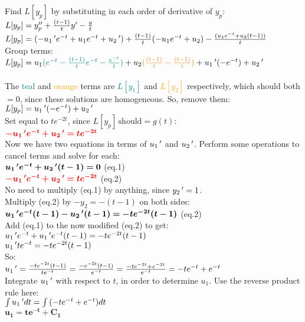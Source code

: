\documentclass{article}
\begin{document}
\begin{enumerate}
\begin{enumerate}
Find $L[y_p]$ by substituting in each order of derivative of $y_p$:\\
$L[y_p] = y_p'' + {(t-1)\over t}y' - {y\over t}$\\
$L[y_p] = (- u_1\,\sp{\prime}e\sp{-t} + u_1e\sp{-t} + u_2\,\sp{\prime}) + {(t-1)\over{t}}(- u_1e\sp{-t} + u_2) - {(u_1e\sp{-t} + u_2(t-1))\over t}$\\
Group terms:\\
$L[y_p] = u_1\textcolor{teal}{(e^{-t} -{(t-1)\over t}e^{-t} -{e^{-t}\over t} )} + u_2\textcolor{orange}{({(t-1)\over t} - {(t-1)\over t})} + u_1\,\sp{\prime}(-e^{-t}) + u_2\,\sp{\prime}$\\\\
The \textcolor{teal}{teal} and \textcolor{orange}{orange} terms are \textcolor{teal}{$L[y_1]$} and \textcolor{orange}{$L[y_2]$} respectively, which should both$=0$, since these solutions are homogeneous. So, remove them:\\
$L[y_p] = u_1\,\sp{\prime}(-e^{-t}) + u_2\,\sp{\prime}$\\
Set equal to $te^{-2t}$, since $L[y_p]\,\text{should} = g(t)$:\\
$\textcolor{red}{\bm{-u_1\,\sp{\prime}e^{-t} + u_2\,\sp{\prime} = te^{-2t}}}$\\
Now we have two equations in terms of $u_1\,\sp{\prime}$ and $u_2\,\sp{\prime}$. Perform some operations to cancel terms and solve for each:\\
\textcolor{red}{$\bm{u_1\,\sp{\prime}e\sp{-t} + u_2\,\sp{\prime}(t-1) = 0}$} (eq.1)\\
$\textcolor{red}{\bm{-u_1\,\sp{\prime}e^{-t} + u_2\,\sp{\prime} = te^{-2t}}}$ (eq.2)\\
No need to multiply (eq.1) by anything, since $y_2\,\sp\prime = 1$.\\
Multiply (eq.2) by $-y_2 = -(t-1)$ on both sides:\\
$\textcolor{black}{\bm{u_1\,\sp{\prime}e^{-t}(t-1) - u_2\,\sp{\prime}(t-1) = -te^{-2t}(t-1)}}$ (eq.2)\\
Add (eq.1) to the now modified (eq.2) to get:\\
$\textcolor{black}{u_1\,\sp{\prime}e^{-t}+u_1\,\sp{\prime}e^{-t}(t-1) = -te^{-2t}(t-1)}$\\
$\textcolor{black}{u_1\,\sp{\prime}te^{-t}= -te^{-2t}(t-1)}$\\
So:\\
$u_1\,\sp{\prime}= {-te^{-2t}(t-1)\over te^{-t}} = {-e^{-2t}(t-1)\over e^{-t}} = {-te^{-2t}+e^{-2t}\over e^{-t}} = -te^{-t}+e^{-t}$\\
Integrate $u_1\,\sp{\prime}$ with respect to $t$, in order to determine $u_1$. Use the reverse product rule here:\\
$\int{u_1\,\sp{\prime}dt} = \int{(-te^{-t}+e^{-t})dt}$\\
$\bm{u_1 = te^{-t} + C_1}$\\


\end{enumerate}
\end{enumerate}
\end{document}
